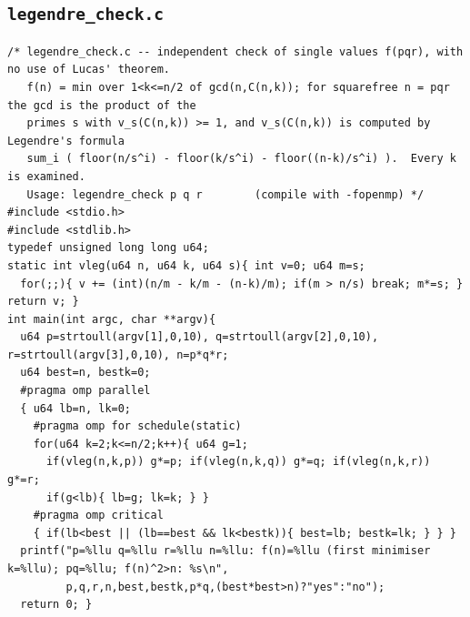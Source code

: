 \documentclass[11pt,a4paper]{article}
\theoremstyle{definition}
\begin{document}
\subsection{\texttt{legendre\_check.c}}
\begin{lstlisting}
/* legendre_check.c -- independent check of single values f(pqr), with no use of Lucas' theorem.
   f(n) = min over 1<k<=n/2 of gcd(n,C(n,k)); for squarefree n = pqr the gcd is the product of the
   primes s with v_s(C(n,k)) >= 1, and v_s(C(n,k)) is computed by Legendre's formula
   sum_i ( floor(n/s^i) - floor(k/s^i) - floor((n-k)/s^i) ).  Every k is examined.
   Usage: legendre_check p q r        (compile with -fopenmp) */
#include <stdio.h>
#include <stdlib.h>
typedef unsigned long long u64;
static int vleg(u64 n, u64 k, u64 s){ int v=0; u64 m=s;
  for(;;){ v += (int)(n/m - k/m - (n-k)/m); if(m > n/s) break; m*=s; } return v; }
int main(int argc, char **argv){
  u64 p=strtoull(argv[1],0,10), q=strtoull(argv[2],0,10), r=strtoull(argv[3],0,10), n=p*q*r;
  u64 best=n, bestk=0;
  #pragma omp parallel
  { u64 lb=n, lk=0;
    #pragma omp for schedule(static)
    for(u64 k=2;k<=n/2;k++){ u64 g=1;
      if(vleg(n,k,p)) g*=p; if(vleg(n,k,q)) g*=q; if(vleg(n,k,r)) g*=r;
      if(g<lb){ lb=g; lk=k; } }
    #pragma omp critical
    { if(lb<best || (lb==best && lk<bestk)){ best=lb; bestk=lk; } } }
  printf("p=%llu q=%llu r=%llu n=%llu: f(n)=%llu (first minimiser k=%llu); pq=%llu; f(n)^2>n: %s\n",
         p,q,r,n,best,bestk,p*q,(best*best>n)?"yes":"no");
  return 0; }
\end{lstlisting}
\end{document}
